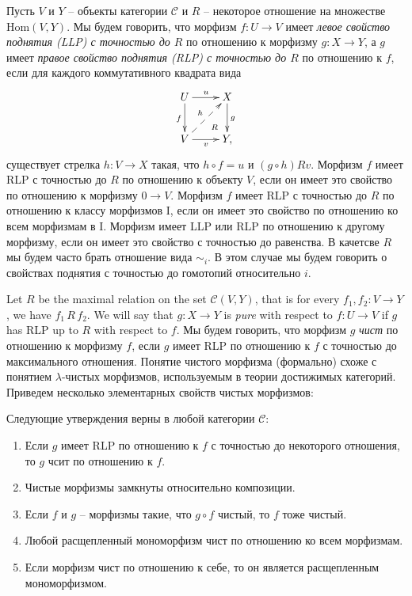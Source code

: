 \documentclass[reqno]{amsart}
\theoremstyle{definition}
\theoremstyle{remark}
\newcommand{\cat}[1]{\mathcal{#1}}
\renewcommand{\C}{\cat{C}}
\newcommand{\fs}[1]{\mathrm{#1}}
\newcommand{\Hom}{\fs{Hom}}
\newcommand{\I}{\mathrm{I}}
\begin{document}
Пусть $V$ и $Y$ -- объекты категории $\C$ и $R$ -- некоторое отношение на множестве $\Hom(V,Y)$.
Мы будем говорить, что морфизм $f : U \to V$ имеет \emph{левое свойство поднятия (LLP) с точностью до $R$} по отношению к морфизму $g : X \to Y$,
а $g$ имеет \emph{правое свойство поднятия (RLP) с точностью до $R$} по отношению к $f$, если для каждого коммутативного квадрата вида
\[ \xymatrix{ U \ar[r]^u \ar@{}[dr]|(.7){R} \ar[d]_f & X \ar[d]^g \\
              V \ar[r]_v \ar@{-->}[ur]^h             & Y,
            } \]
существует стрелка $h : V \to X$ такая, что $h \circ f = u$ и $(g \circ h) R v$.
Морфизм $f$ имеет RLP с точностью до $R$ по отношению к объекту $V$, если он имеет это свойство по отношению к морфизму $0 \to V$.
Морфизм $f$ имеет RLP с точностью до $R$ по отношению к классу морфизмов $\I$, если он имеет это свойство по отношению ко всем морфизмам в $\I$.
Морфизм имеет LLP или RLP по отношению к другому морфизму, если он имеет это свойство с точностью до равенства.
В качетсве $R$ мы будем часто брать отношение вида $\sim_i$.
В этом случае мы будем говорить о свойствах поднятия с точностью до гомотопий относительно $i$.

Let $R$ be the maximal relation on the set $\C(V,Y)$, that is for every $f_1,f_2 : V \to Y$, we have $f_1\,R\,f_2$.
We will say that $g : X \to Y$ is \emph{pure} with respect to $f : U \to V$ if $g$ has RLP up to $R$ with respect to $f$.
Мы будем говорить, что морфизм $g$ \emph{чист} по отношению к морфизму $f$, если $g$ имеет RLP по отношению к $f$ с точностью до максимального отношения.
Понятие чистого морфизма (формально) схоже с понятием $\lambda$-чистых морфизмов, используемым в теории достижимых категорий.
Приведем несколько элементарных свойств чистых морфизмов:

\begin{prop} Следующие утверждения верны в любой категории $\C$:
\begin{enumerate}
\item Если $g$ имеет RLP по отношению к $f$ с точностью до некоторого отношения, то $g$ чсит по отношению к $f$.
\item Чистые морфизмы замкнуты относительно композиции.
\item Если $f$ и $g$ -- морфизмы такие, что $g \circ f$ чистый, то $f$ тоже чистый.
\item Любой расщепленный мономорфизм чист по отношению ко всем морфизмам.
\item Если морфизм чист по отношению к себе, то он является расщепленным мономорфизмом.
\end{enumerate}
\end{prop}
\end{document}

